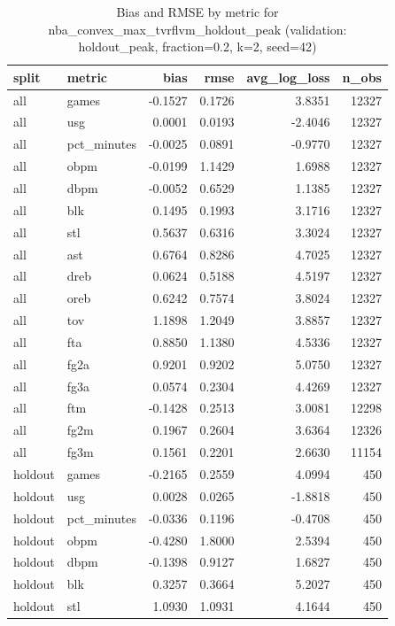\begin{table}
\caption{Bias and RMSE by metric for nba_convex_max_tvrflvm_holdout_peak (validation: holdout_peak, fraction=0.2, k=2, seed=42)}
\label{tab:nba_convex_max_tvrflvm_holdout_peak_vs_holdout_peak_f20_k2_s42_bias_rmse}
\begin{tabular}{llrrrr}
\toprule
split & metric & bias & rmse & avg\_log\_loss & n\_obs \\
\midrule
all & games & -0.1527 & 0.1726 & 3.8351 & 12327 \\
all & usg & 0.0001 & 0.0193 & -2.4046 & 12327 \\
all & pct\_minutes & -0.0025 & 0.0891 & -0.9770 & 12327 \\
all & obpm & -0.0199 & 1.1429 & 1.6988 & 12327 \\
all & dbpm & -0.0052 & 0.6529 & 1.1385 & 12327 \\
all & blk & 0.1495 & 0.1993 & 3.1716 & 12327 \\
all & stl & 0.5637 & 0.6316 & 3.3024 & 12327 \\
all & ast & 0.6764 & 0.8286 & 4.7025 & 12327 \\
all & dreb & 0.0624 & 0.5188 & 4.5197 & 12327 \\
all & oreb & 0.6242 & 0.7574 & 3.8024 & 12327 \\
all & tov & 1.1898 & 1.2049 & 3.8857 & 12327 \\
all & fta & 0.8850 & 1.1380 & 4.5336 & 12327 \\
all & fg2a & 0.9201 & 0.9202 & 5.0750 & 12327 \\
all & fg3a & 0.0574 & 0.2304 & 4.4269 & 12327 \\
all & ftm & -0.1428 & 0.2513 & 3.0081 & 12298 \\
all & fg2m & 0.1967 & 0.2604 & 3.6364 & 12326 \\
all & fg3m & 0.1561 & 0.2201 & 2.6630 & 11154 \\
holdout & games & -0.2165 & 0.2559 & 4.0994 & 450 \\
holdout & usg & 0.0028 & 0.0265 & -1.8818 & 450 \\
holdout & pct\_minutes & -0.0336 & 0.1196 & -0.4708 & 450 \\
holdout & obpm & -0.4280 & 1.8000 & 2.5394 & 450 \\
holdout & dbpm & -0.1398 & 0.9127 & 1.6827 & 450 \\
holdout & blk & 0.3257 & 0.3664 & 5.2027 & 450 \\
holdout & stl & 1.0930 & 1.0931 & 4.1644 & 450 \\

\end{tabular}
\end{table}
